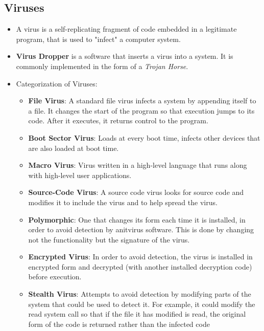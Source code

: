 \documentclass{article}
\theoremstyle{plain}
\theoremstyle{definition}
\begin{document}
\subsection{Viruses}
\begin{itemize}
    \item A virus is a self-replicating fragment of code embedded in a legitimate program, that is used to "infect" a computer system. 
    
    \item \textbf{Virus Dropper} is a software that inserts a virus into a system. It is commonly implemented in the form of a \textit{Trojan Horse}.
    
    \item Categorization of Viruses:
    \begin{itemize}
        \item \textbf{File Virus}: A standard file virus infects a system by appending itself to a file. It changes the start of the program so that execution jumps to its code. After it executes, it returns control to the program. 
        
        \item \textbf{Boot Sector Virus}: Loads at every boot time, infects other devices that are also loaded at boot time. 
        
        \item \textbf{Macro Virus}: Virus written in a high-level language that runs along with high-level user applications. 
        
        \item \textbf{Source-Code Virus}: A source code virus looks for source code and modifies it to include the virus and to help spread the virus.
        
        \item \textbf{Polymorphic}: One that changes its form each time it is installed, in order to avoid detection by anitvirus software. This is done by changing not the functionality but the signature of the virus. 
        
        \item \textbf{Encrypted Virus}: In order to avoid detection, the virus is installed in encrypted form and decrypted (with another installed decryption code) before execution. 
        
        \item \textbf{Stealth Virus}: Attempts to avoid detection by modifying parts of the system that could be used to detect it. For example, it could modify the read system call so that if the file it has modified is read, the original form of the code is returned rather than the infected code
    \end{itemize}
\end{itemize}
\end{document}
